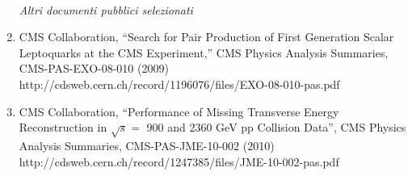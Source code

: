 \documentclass[10pt]{letter}
\begin{document}
\begin{enumerate}
~\\
\begin{center} \textit{Altri documenti pubblici selezionati} \\ \end{center}

\item CMS Collaboration, 
  ``Search for Pair Production of First Generation Scalar Leptoquarks at the CMS Experiment,''
  CMS Physics Analysis Summaries, CMS-PAS-EXO-08-010 (2009) \\
  http://cdsweb.cern.ch/record/1196076/files/EXO-08-010-pas.pdf 

\item CMS Collaboration,
  ``Performance of Missing Transverse Energy Reconstruction in $\sqrt{s}=$ 900 and 2360 GeV pp Collision Data'',
  CMS Physics Analysis Summaries, CMS-PAS-JME-10-002 (2010) \\
  http://cdsweb.cern.ch/record/1247385/files/JME-10-002-pas.pdf

\end{enumerate}
\end{document}
